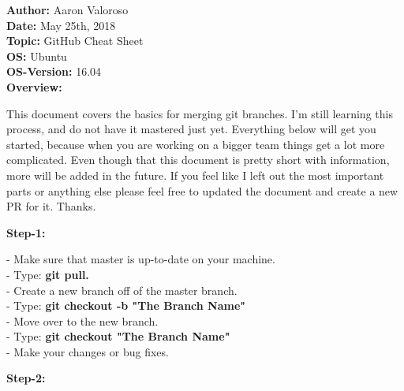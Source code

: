 \documentclass[11pt, a4papper]{article}
\begin{document}
\noindent\textbf{Author: } Aaron Valoroso \\
\textbf{Date: } May 25th, 2018 \\
\textbf{Topic: } GitHub Cheat Sheet \\
\textbf{OS: } Ubuntu \\
\textbf{OS-Version: } 16.04 \\[1cm]

\textbf{Overview: } \\
\begin{adjustwidth}{3cm}{} 
This document covers the basics for merging git branches. I'm still learning this process, and do not have it mastered just yet. Everything below will get you started, because when you are working on a bigger team things get a lot more complicated. Even though that this document is pretty short with information, more will be added in the future. If you feel like I left out the most important parts or anything else please feel free to updated the document and create a new PR for it. Thanks. \\
\end{adjustwidth}
\indent \indent \textbf{Step-1:} \\
\begin{adjustwidth}{3cm}{} 
- Make sure that master is up-to-date on your machine. \\
\indent - Type: \textbf{git pull.} \\
- Create a new branch off of the master branch. \\
\indent - Type: \textbf{git checkout -b "The Branch Name"} \\
- Move over to the new branch. \\
\indent - Type: \textbf{git checkout "The Branch Name"} \\
- Make your changes or bug fixes. \\
\end{adjustwidth}
\indent \indent \textbf{Step-2:} \\
\end{document}

